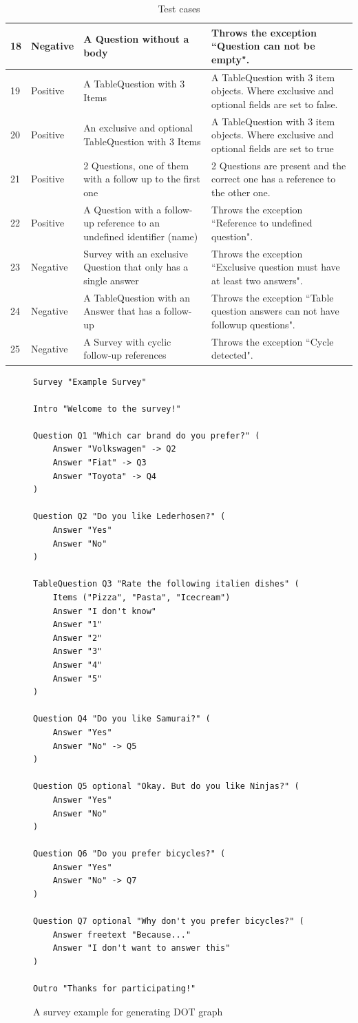 \documentclass[runningheads,a4paper]{llncs}
\begin{document}
\begin{table}[htb]
\begin{tabular}{|l|l|p{5cm}|p{5cm}|}
18 & Negative & A Question without a body & Throws the exception ``Question can not be empty".\\ \hline
19 & Positive & A TableQuestion with 3 Items & A TableQuestion with 3 item objects. Where exclusive and optional fields are set to false.\\ \hline
20 & Positive & An exclusive and optional TableQuestion with 3 Items & A TableQuestion with 3 item objects. Where exclusive and optional fields are set to true\\ \hline
21 & Positive & 2 Questions, one of them with a follow up to the first one & 2 Questions are present and the correct one has a reference to the other one.\\ \hline
22 & Positive & A Question with a follow-up reference to an undefined identifier (name) & Throws the exception ``Reference to undefined question".\\ \hline
23 & Negative & Survey with an exclusive Question that only has a single answer & Throws the exception ``Exclusive question must have at least two answers".\\ \hline
24 & Negative & A TableQuestion with an Answer that has a follow-up & Throws the exception ``Table question answers can not have followup questions".\\ \hline
25 & Negative & A Survey with cyclic follow-up references & Throws the exception ``Cycle detected".\\ \hline
\end{tabular}
\caption{Test cases}
\label{tbl:test_cases}
\end{table}

\newpage
\begin{figure}[htb]
\begin{lstlisting}[language=survey]
Survey "Example Survey"

Intro "Welcome to the survey!"

Question Q1 "Which car brand do you prefer?" (
    Answer "Volkswagen" -> Q2
    Answer "Fiat" -> Q3
    Answer "Toyota" -> Q4
)

Question Q2 "Do you like Lederhosen?" (
    Answer "Yes"
    Answer "No"
)

TableQuestion Q3 "Rate the following italien dishes" (
    Items ("Pizza", "Pasta", "Icecream")
    Answer "I don't know"
    Answer "1"
    Answer "2"
    Answer "3"
    Answer "4"
    Answer "5"
)

Question Q4 "Do you like Samurai?" (
    Answer "Yes"
    Answer "No" -> Q5
)

Question Q5 optional "Okay. But do you like Ninjas?" (
    Answer "Yes"
    Answer "No"
)

Question Q6 "Do you prefer bicycles?" (
    Answer "Yes"
    Answer "No" -> Q7
)

Question Q7 optional "Why don't you prefer bicycles?" (
    Answer freetext "Because..."
    Answer "I don't want to answer this"
)

Outro "Thanks for participating!"
\end{lstlisting}
\caption{A survey example for generating DOT graph}
\label{fig:survey_example_dot}
\end{figure}
\end{document}
